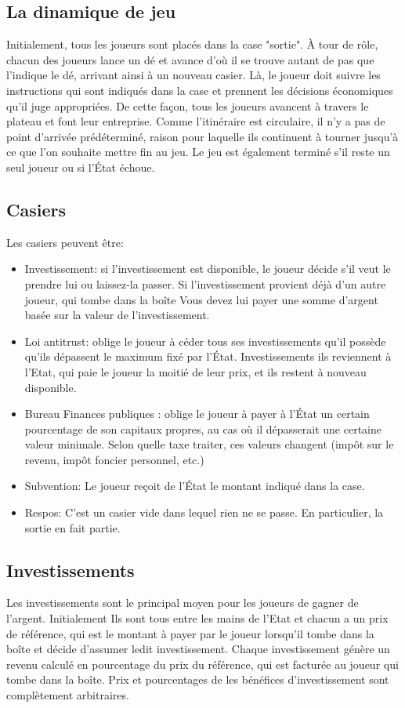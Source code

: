 \documentclass[12pt]{article}
\begin{document}
    \subsection{La dinamique de jeu}
    Initialement, tous les joueurs sont placés dans la case "sortie". À tour de rôle, chacun
    des joueurs lance un dé et avance d'où il se trouve autant de pas que l'indique le
    dé, arrivant ainsi à un nouveau casier. Là, le joueur doit suivre les instructions
    qui sont indiqués dans la case et prennent les décisions économiques qu'il juge appropriées.
    De cette façon, tous les joueurs avancent à travers le plateau et font leur
    entreprise. Comme l'itinéraire est circulaire, il n'y a pas de point d'arrivée prédéterminé,
    raison pour laquelle ils continuent à tourner jusqu'à ce que l'on souhaite mettre fin au jeu.
    Le jeu est également terminé s'il reste un seul joueur ou si l'État échoue.
    
    \subsection{Casiers}
    Les casiers peuvent être:
    \begin{itemize}
        \item Investissement: si l'investissement est disponible, le joueur décide s'il veut le prendre
    lui ou laissez-la passer. Si l'investissement provient déjà d'un autre joueur, qui tombe dans la boîte
    Vous devez lui payer une somme d'argent basée sur la valeur de l'investissement.
        \item Loi antitrust: oblige le joueur à céder tous ses investissements
    qu'il possède qu'ils dépassent le maximum fixé par l'État. Investissements
    ils reviennent à l'Etat, qui paie le joueur la moitié de leur prix, et ils restent
    à nouveau disponible.
        \item  Bureau Finances publiques : oblige le joueur à payer à l'État un certain pourcentage de son
    capitaux propres, au cas où il dépasserait une certaine valeur minimale. Selon quelle taxe
    traiter, ces valeurs changent (impôt sur le revenu, impôt foncier personnel, etc.)
        \item Subvention: Le joueur reçoit de l'État le montant indiqué dans la case.
        \item Respos: C'est un casier vide dans lequel rien ne se passe. En particulier, la sortie
    en fait partie.
    \end{itemize}

    \subsection{Investissements}
Les investissements sont le principal moyen pour les joueurs de gagner de l'argent. Initialement
Ils sont tous entre les mains de l'Etat et chacun a un prix de référence, qui est le
montant à payer par le joueur lorsqu'il tombe dans la boîte et décide d'assumer ledit
investissement.
Chaque investissement génère un revenu calculé en pourcentage du prix du
référence, qui est facturée au joueur qui tombe dans la boîte. Prix et pourcentages de
les bénéfices d'investissement sont complètement arbitraires.
\end{document}
